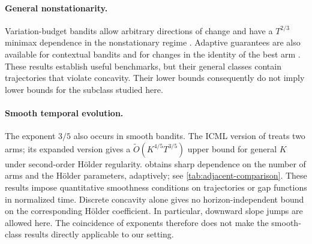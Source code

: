 \documentclass[11pt]{article}
\theoremstyle{remark}
\begin{document}
\paragraph{General nonstationarity.}
Variation-budget bandits allow arbitrary directions of change and have a
$T^{2/3}$ minimax dependence in the nonstationary regime
\citep{besbes2014nonstationary}. Adaptive guarantees are also available for
contextual bandits \citep{chen2019nonstationary} and for changes in the identity
of the best arm \citep{abbasi2023newlook}. These results establish useful
benchmarks, but their general classes contain trajectories that violate
concavity. Their lower bounds consequently do not imply lower bounds for the
subclass studied here.

\paragraph{Smooth temporal evolution.}
The exponent $3/5$ also occurs in smooth bandits.
The ICML version of \citet{jia2023smooth} treats two arms; its expanded version
\citep{jia2024smooth} gives a $\widetilde O(K^{4/5}T^{3/5})$ upper bound for
general $K$ under second-order H\"older regularity.
\citet{suk2025adaptive} obtains sharp dependence on the number of arms and the
H\"older parameters, adaptively; see \cref{tab:adjacent-comparison}.
These results impose quantitative smoothness conditions on trajectories or
gap functions in normalized time. Discrete concavity alone gives no
horizon-independent bound on the corresponding H\"older coefficient.
In particular, downward slope jumps are allowed here. The coincidence of
exponents therefore does not make the smooth-class results directly
applicable to our setting.
\end{document}
